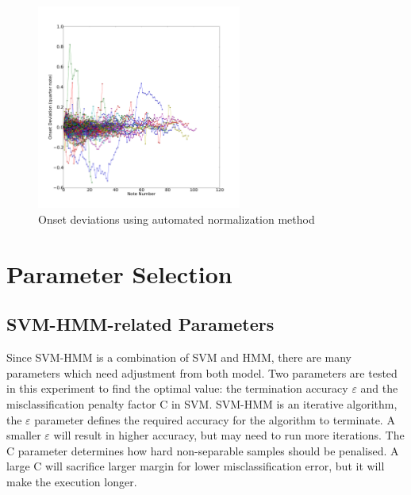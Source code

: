 
\begin{figure}[tp]
   \begin{center}
      \includegraphics[width=0.6\textwidth]{fig/lian_onset_1}
   \end{center}
   \caption{Onset deviations using automated normalization method}
   \label{fig:normauto}
\end{figure}


\section{Parameter Selection}
\label{sec:paramselect}
\subsection{SVM-HMM-related Parameters}
Since SVM-HMM is a combination of SVM and HMM, there are many parameters which need adjustment from both model. Two parameters are tested in this experiment to find the optimal value: the termination accuracy $\varepsilon$ and the misclassification penalty factor C in SVM. SVM-HMM is an iterative algorithm, the $\varepsilon$ parameter defines the required accuracy for the algorithm to terminate. A smaller $\varepsilon$ will result in higher accuracy, but may need to run more iterations. The C parameter determines how hard non-separable samples should be penalised. A large C will sacrifice larger margin for lower misclassification error, but it will make the execution longer.%

